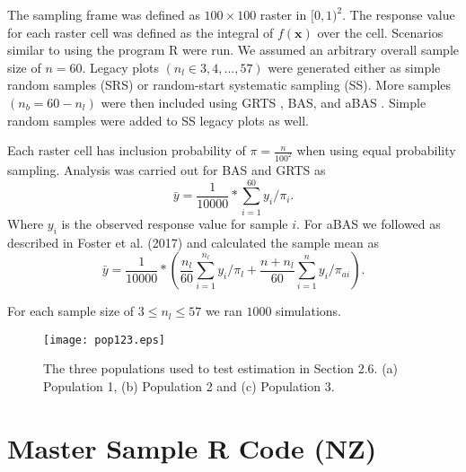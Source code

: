 \documentclass[]{article}
\begin{document}
The sampling frame was defined as $100\times100$ raster in $[0,1)^2$. The response value for each raster cell was defined as the integral of $f(\boldsymbol{x})$ over the cell. Scenarios similar to \citealt{Foster2017} using the program R \citep{R} were run. We assumed an arbitrary overall sample size of $n = 60$. Legacy plots $(n_l \in 3,4,...,57)$ were generated either as simple random samples (SRS) or random-start systematic sampling (SS). More samples $(n_b = 60 - n_l)$ were then included using GRTS \citep{spsurvey}, BAS, and aBAS \citep{MBHdesign}. Simple random samples were added to SS legacy plots as well.

Each raster cell has inclusion probability of $\pi = \frac{n}{100^2}$ when using equal probability sampling. Analysis was carried out for BAS and GRTS as
$$ \bar{y} = \frac{1}{10000} * \sum_{i = 1}^{60} y_i/\pi_i. $$
Where $y_i$ is the observed response value for sample $i$. For aBAS we followed as described in Foster et al. (2017) and calculated the sample mean as
$$ \bar{y} = \frac{1}{10000} * \left( \frac{n_l}{60}\sum_{i = 1}^{n_l} y_i/\pi_l  + \frac{n + n_l}{60}\sum_{i = 1}^{n} y_i/\pi_{ai} \right).$$

For each sample size of $3 \leq n_l \leq 57$ we ran $1000$ simulations.

\newpage

\begin{figure}[H]
	\texttt{[image: pop123.eps]}
	\caption{The three populations used to test estimation in Section 2.6. (a) Population 1, (b) Population 2 and (c) Population 3.}
	\label{figpop}
\end{figure}

\newpage

\section{Master Sample R Code (NZ)}
\end{document}
